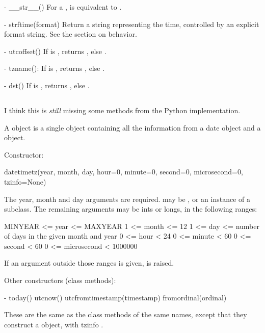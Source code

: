   - __str__()
    For a  ,  is equivalent to
    .

  - strftime(format)
    Return a string representing the time, controlled by an explicit
    format string.  See the section on  behavior.

  - utcoffset()
    If  is , returns , else
    .

  - tzname():
    If  is , returns , else
    .

  - dst()
    If  is , returns , else
    .



\subsection{   \label{datetime-datetimetz}}

\begin{notice}[warning]
  I think this is \emph{still} missing some methods from the
  Python implementation.
\end{notice}

A  object is a single object containing all the information
from a date object and a  object.

Constructor:

    datetimetz(year, month, day,
               hour=0, minute=0, second=0, microsecond=0, tzinfo=None)

    The year, month and day arguments are required.   may
    be , or an instance of a  subclass.  The
    remaining arguments may be ints or longs, in the following ranges:

        MINYEAR <= year <= MAXYEAR
        1 <= month <= 12
        1 <= day <= number of days in the given month and year
        0 <= hour < 24
        0 <= minute < 60
        0 <= second < 60
        0 <= microsecond < 1000000

    If an argument outside those ranges is given,
     is raised.

Other constructors (class methods):

  - today()
    utcnow()
    utcfromtimestamp(timestamp)
    fromordinal(ordinal)

    These are the same as the  class methods of the
    same names, except that they construct a 
    object, with tzinfo .

